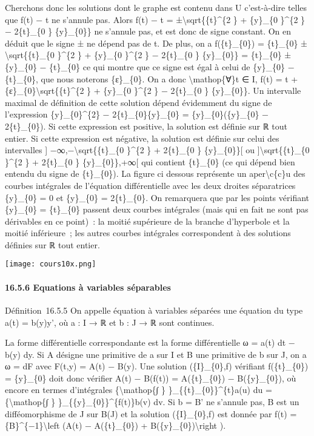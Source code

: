 \documentclass[]{article}
\begin{document}
Cherchons donc les solutions dont le graphe est contenu dans U
c'est-à-dire telles que f(t) − t ne s'annule pas. Alors f(t) − t =
±\textbackslash{}sqrt\{\{t\}\^{}\{2 \} + \{y\}\_\{0 \}\^{}\{2 \} −
2\{t\}\_\{0 \} \{y\}\_\{0\}\} ne s'annule pas, et est donc de signe
constant. On en déduit que le signe ± ne dépend pas de t. De plus, on a
f(\{t\}\_\{0\}) = \{t\}\_\{0\} ±\textbackslash{}sqrt\{\{t\}\_\{0
\}\^{}\{2 \} + \{y\}\_\{0 \}\^{}\{2 \} − 2\{t\}\_\{0 \} \{y\}\_\{0\}\} =
\{t\}\_\{0\} ±\textbar{}\{y\}\_\{0\} − \{t\}\_\{0\}\textbar{} ce qui
montre que ce signe est égal à celui de \{y\}\_\{0\} − \{t\}\_\{0\}, que
nous noterons \{ε\}\_\{0\}. On a donc \textbackslash{}mathop\{∀\}t ∈ I,
f(t) = t + \{ε\}\_\{0\}\textbackslash{}sqrt\{\{t\}\^{}\{2 \} +
\{y\}\_\{0 \}\^{}\{2 \} − 2\{t\}\_\{0 \} \{y\}\_\{0\}\}. Un intervalle
maximal de définition de cette solution dépend évidemment du signe de
l'expression \{y\}\_\{0\}\^{}\{2\} − 2\{t\}\_\{0\}\{y\}\_\{0\} =
\{y\}\_\{0\}(\{y\}\_\{0\} − 2\{t\}\_\{0\}). Si cette expression est
positive, la solution est définie sur ℝ tout entier. Si cette expression
est négative, la solution est définie sur celui des intervalles {]}
−∞,−\textbackslash{}sqrt\{\{t\}\_\{0 \}\^{}\{2 \} + 2\{t\}\_\{0 \}
\{y\}\_\{0\}\}{[} ou {]}\textbackslash{}sqrt\{\{t\}\_\{0 \}\^{}\{2 \} +
2\{t\}\_\{0 \} \{y\}\_\{0\}\},+∞{[} qui contient \{t\}\_\{0\} (ce qui
dépend bien entendu du signe de \{t\}\_\{0\}). La figure ci dessous
représente un aper\textbackslash{}c\{c\}u des courbes intégrales de
l'équation différentielle avec les deux droites séparatrices
\{y\}\_\{0\} = 0 et \{y\}\_\{0\} = 2\{t\}\_\{0\}. On remarquera que par
les points vérifiant \{y\}\_\{0\} = \{t\}\_\{0\} passent deux courbes
intégrales (mais qui en fait ne sont pas dérivables en ce point)~: la
moitié supérieure de la branche d'hyperbole et la moitié inférieure~;
les autres courbes intégrales correspondent à des solutions définies sur
ℝ tout entier.

\texttt{[image: cours10x.png]}

\paragraph{16.5.6 Equations à variables séparables}

Définition~16.5.5 On appelle équation à variables séparées une équation
du type a(t) = b(y)y', où a : I → ℝ et b : J → ℝ sont continues.

La forme différentielle correspondante est la forme différentielle ω =
a(t) dt − b(y) dy. Si A désigne une primitive de a sur I et B une
primitive de b sur J, on a ω = dF avec F(t,y) = A(t) − B(y). Une
solution (\{I\}\_\{0\},f) vérifiant f(\{t\}\_\{0\}) = \{y\}\_\{0\} doit
donc vérifier A(t) − B(f(t)) = A(\{t\}\_\{0\}) − B(\{y\}\_\{0\}), où
encore en termes d'intégrales \{\textbackslash{}mathop\{∫ \}
\}\_\{\{t\}\_\{0\}\}\^{}\{t\}a(u) du =\{\textbackslash{}mathop\{∫ \}
\}\_\{\{y\}\_\{0\}\}\^{}\{f(t)\}b(v) dv. Si b = B' ne s'annule pas, B
est un difféomorphisme de J sur B(J) et la solution (\{I\}\_\{0\},f) est
donnée par f(t) = \{B\}\^{}\{−1\}\textbackslash{}left (A(t) −
A(\{t\}\_\{0\}) + B(\{y\}\_\{0\})\textbackslash{}right ).
\end{document}
